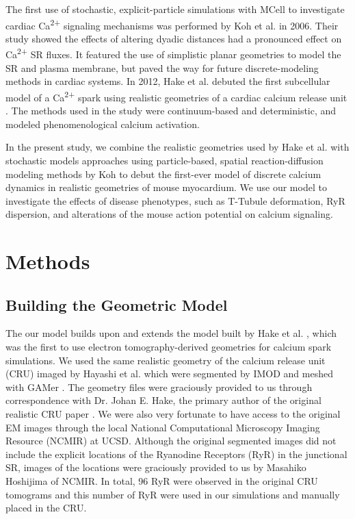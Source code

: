 \documentclass[12pt]{ucsddissertation}
\begin{document}
The first use of stochastic, explicit-particle simulations with MCell to investigate cardiac Ca\textsuperscript{2+} signaling mechanisms was performed by Koh et al. in 2006\cite{Koh2006}. Their study showed the effects of altering dyadic distances had a pronounced effect on Ca\textsuperscript{2+} SR fluxes. It featured the use of simplistic planar geometries to model the SR and plasma membrane, but paved the way for future discrete-modeling methods in cardiac systems. In 2012, Hake et al. debuted the first subcellular model of a Ca\textsuperscript{2+} spark \cite{Hake2012} using realistic geometries of a cardiac calcium release unit \cite{Hayashi2009}. The methods used in the study were continuum-based and deterministic, and modeled phenomenological calcium activation. 

In the present study, we combine the realistic geometries used by Hake et al. with stochastic models approaches using particle-based, spatial reaction-diffusion modeling methods\cite{Koh2006} by Koh to debut the first-ever model of discrete calcium dynamics in realistic geometries of mouse myocardium. We use our model to investigate the effects of disease phenotypes, such as T-Tubule deformation\cite{Louch2010}, RyR dispersion\cite{Kolstad2018}, and alterations of the mouse action potential\cite{Morotti2014} on calcium signaling. 


 \section{Methods}
 
 \subsection{Building the Geometric Model}
 
 The our model builds upon and extends the model built by Hake et al. \cite{Hake2012}, which was the first to use electron tomography-derived geometries for calcium spark simulations. We used the same realistic geometry of the calcium release unit (CRU) imaged by Hayashi et al. \cite{Hayashi2009} which were segmented by IMOD \cite{Mastronarde2008} and meshed with GAMer \cite{Yu2008,Lee2018}. The geometry files were graciously provided to us through correspondence with Dr. Johan E. Hake, the primary author of the original realistic CRU paper \cite{Hake2012}. We were also very fortunate to have access to the original EM images through the local National Computational Microscopy Imaging Resource (NCMIR) at UCSD. Although the original segmented images did not include the explicit locations of the Ryanodine Receptors (RyR) in the junctional SR, images of the locations were graciously provided to us by Masahiko Hoshijima of NCMIR. In total, 96 RyR were observed in the original CRU tomograms and this number of RyR were used in our simulations and manually placed in the CRU.
 
\end{document}

